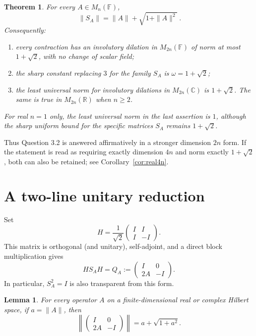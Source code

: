 \documentclass[11pt]{article}
\newtheorem{theorem}{Theorem}
\newtheorem{lemma}{Lemma}
\newcommand{\F}{\mathbb F}
\newcommand{\C}{\mathbb C}
\newcommand{\R}{\mathbb R}
\begin{document}
\begin{theorem}\label{thm:main}
For every \(A\in M_n(\F)\),
\begin{equation}\label{eq:normformula}
 \boxed{\ \|S_A\|=\|A\|+\sqrt{1+\|A\|^2}\ }.
\end{equation}
Consequently:
\begin{enumerate}
\item every contraction has an involutory dilation in \(M_{2n}(\F)\) of
      norm at most \(1+\sqrt2\), with no change of scalar field;
\item the sharp constant replacing \(3\) for the family \(S_A\) is
      \(\omega=1+\sqrt2\);
\item the least universal norm for involutory dilations in \(M_{2n}(\C)\)
      is \(1+\sqrt2\).  The same is true in \(M_{2n}(\R)\) when \(n\ge2\).
\end{enumerate}
For real \(n=1\) only, the least universal norm in the last assertion is
\(1\), although the sharp uniform bound for the specific matrices \(S_A\)
remains \(1+\sqrt2\).
\end{theorem}

Thus Question 3.2 is answered affirmatively in a stronger dimension
\(2n\) form.  If the statement is read as requiring exactly dimension
\(4n\) and norm exactly \(1+\sqrt2\), both can also be retained; see
Corollary~\ref{cor:real4n}.

\section{A two-line unitary reduction}

Set
\[
 H=\frac1{\sqrt2}\begin{pmatrix}I&I\\I&-I\end{pmatrix}.
\]
This matrix is orthogonal (and unitary), self-adjoint, and a direct block
multiplication gives
\begin{equation}\label{eq:reduction}
 HS_AH=Q_A:=\begin{pmatrix}I&0\\2A&-I\end{pmatrix}.
\end{equation}
In particular, \(S_A^2=I\) is also transparent from this form.

\begin{lemma}\label{lem:blocknorm}
For every operator \(A\) on a finite-dimensional real or complex Hilbert
space, if \(a=\|A\|\), then
\[
 \left\|\begin{pmatrix}I&0\\2A&-I\end{pmatrix}\right\|
 =a+\sqrt{1+a^2}.
\]
\end{lemma}
\end{document}
